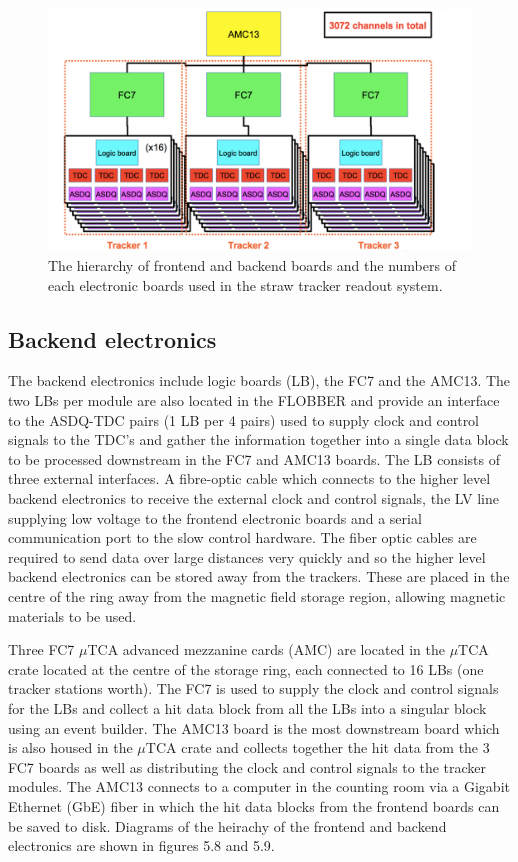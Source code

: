 \begin{figure}[th]
\centering
\includegraphics[scale=0.8]{Figures/daqdatachain}
\decoRule
\caption{The hierarchy of frontend and backend boards and the numbers of each electronic boards used in the straw tracker readout system.}
\label{fig:daqdatachain}
\end{figure}

\subsection{Backend electronics}

The backend electronics include logic boards (LB), the FC7 and the AMC13. The two LBs per module are also located in the FLOBBER and provide an interface to the ASDQ-TDC pairs (1 LB per 4 pairs) used to supply clock and control signals to the TDC's and gather the information together into a single data block to be processed downstream in the FC7 and AMC13 boards. The LB consists of three external interfaces. A fibre-optic cable which connects to the higher level backend electronics to receive the external clock and control signals, the LV line supplying low voltage to the frontend electronic boards and a serial communication port to the slow control hardware. The fiber optic cables are required to send data over large distances very quickly and so the higher level backend electronics can be stored away from the trackers. These are placed in the centre of the ring away from the magnetic field storage region, allowing magnetic materials to be used.

Three FC7 $\mu$TCA advanced mezzanine cards (AMC) are located in the $\mu$TCA crate located at the centre of the storage ring, each connected to 16 LBs (one tracker stations worth). The FC7 is used to supply the clock and control signals for the LBs and collect a hit data block from all the LBs into a singular block using an event builder. The AMC13 board is the most downstream board which is also housed in the $\mu$TCA crate and collects together the hit data from the 3 FC7 boards as well as distributing the clock and control signals to the tracker modules. The AMC13 connects to a computer in the counting room via a Gigabit Ethernet (GbE) fiber in which the hit data blocks from the frontend boards can be saved to disk. Diagrams of the heirachy of the frontend and backend electronics are shown in figures 5.8 and 5.9.

